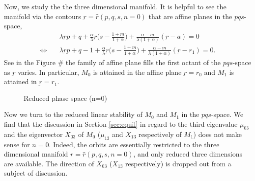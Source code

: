 \documentclass[a4paper,11pt]{article}
\begin{document}
Now, we study the the three dimensional manifold. It is helpful to see the manifold via the contours $\underbar{r}=\hat{r}(p,q,s,n=0)$ that are affine planes in the $pqs$-space,
\begin{equation}
 \begin{aligned}
  &\lambda \underbar{r}p + q +\frac{\alpha}{\lambda}\underbar{r}\big(s- \frac{1+m}{1+\alpha}\big) + \frac{\alpha-m}{\lambda(1+\alpha)}(\underbar{r}-a) = 0\\
  \Longleftrightarrow \quad&\lambda \underbar{r}p + q-1 +\frac{\alpha}{\lambda}\underbar{r}\big(s- \frac{1+m}{1+\alpha}\big) + \frac{\alpha-m}{\lambda(1+\alpha)}(\underbar{r}-r_1) = 0.
 \end{aligned}
\end{equation}
See in the Figure \# the family of affine plane fills the first octant of the $pqs$-space as $\underbar{r}$ varies. In particular, $M_0$ is attained in the affine plane $\underbar{r}=r_0$ and $M_1$ is attained in $\underbar{r}=r_1$.

\begin{figure}
 \centering
  \subfigure[Affine contours in $pqs$-space]{
  \psfrag{r}{\scriptsize$r$}%
  \texttt{[image: affine\_a.eps]}\label{fig:flow0a}
  }
  \quad \quad
  \subfigure[Flow in $pqs$-space for $n=0$]{
  \psfrag{r}{\scriptsize$s-\frac{1+m}{1+\alpha}$}%
  \texttt{[image: flow0pqs.eps]}\label{fig:flow0b}
  }
  \caption{Reduced phase space (n=0)} \label{fig:flow0} 
\end{figure}


Now we turn to the reduced linear stability of $M_0$ and $M_1$ in the $pqs$-space. We find that the discussion in Section \ref{sec:equil} in regard to the third eigenvalue $\mu_{03}$ and the eigenvector $X_{03}$ of $M_0$ ($\mu_{13}$ and $X_{13}$ respectively of $M_1$) does not make sense for $n=0$. Indeed, the orbits are essentially restricted to the three dimensional manifold $r=\hat{r}(p,q,s,n=0)$, and only reduced three dimensions are available.
The direction of $X_{03}$ ($X_{13}$ respectively) is dropped out from a subject of discussion.
\end{document}

